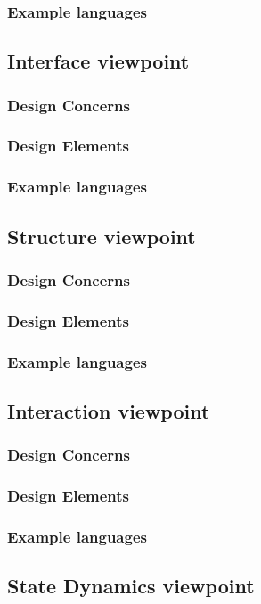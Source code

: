 \documentclass[onecolumn, draftclsnofoot,10pt, compsoc]{IEEEtran}
\begin{document}
\begin{singlespace}
		\subsubsection{Example languages}
	\subsection{Interface viewpoint}
		\subsubsection{Design Concerns}
		\subsubsection{Design Elements}
		\subsubsection{Example languages}
	\subsection{Structure viewpoint}
		\subsubsection{Design Concerns}
		\subsubsection{Design Elements}
		\subsubsection{Example languages}
	\subsection{Interaction viewpoint}
		\subsubsection{Design Concerns}
		\subsubsection{Design Elements}
		\subsubsection{Example languages}
	\subsection{State Dynamics viewpoint}

\end{singlespace}
\end{document}
